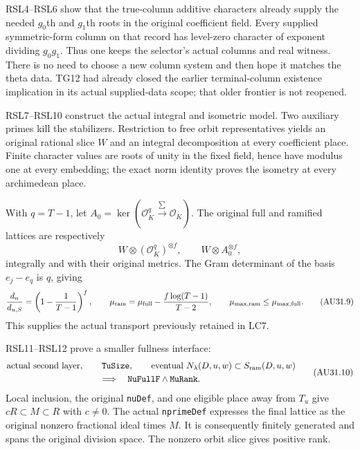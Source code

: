 RSL4--RSL6 show that the true-column additive characters already
supply the needed $g_0$th and $g_1$th roots in the original
coefficient field. Every supplied symmetric-form column on that
record has level-zero character of exponent dividing $g_0g_1$.
Thus one keeps the selector's actual columns and real witness.
There is no need to choose a new column system and then hope
it matches the theta data. TG12 had already closed the earlier
terminal-column existence implication in its actual supplied-data
scope; that older frontier is not reopened.

RSL7--RSL10 construct the actual integral and isometric model.
Two auxiliary primes kill the stabilizers. Restriction to free
orbit representatives yields an original rational slice $W$ and
an integral decomposition at every coefficient place. Finite
character values are roots of unity in the fixed field, hence have
modulus one at every embedding; the exact norm identity proves
the isometry at every archimedean place.

With $q=T-1$, let
$A_0=\ker(\mathcal O_K^q\xrightarrow{\sum}\mathcal O_K)$.
The original full and ramified lattices are respectively
\[
 W\otimes(\mathcal O_K^q)^{\otimes f},
 \qquad W\otimes A_0^{\otimes f},
                                                               \tag{AU31.8}
\]
integrally and with their original metrics. The Gram determinant
of the basis $e_j-e_q$ is $q$, giving
\[
 \frac{d_u}{d_{u,S}}
   =\left(1-\frac1{T-1}\right)^f,\qquad
 \mu_{\rm ram}=\mu_{\rm full}
                     -\frac{f\log(T-1)}{T-2},\qquad
 \mu_{\max,\rm ram}\le\mu_{\max,\rm full}.             \tag{AU31.9}
\]
This supplies the actual transport previously retained in LC7.

RSL11--RSL12 prove a smaller fullness interface:
\[
\begin{gathered}
\text{actual second layer},\qquad\texttt{TuSize},\qquad
\text{eventual }N_\lambda(D,u,w)\subset S_{\rm ram}(D,u,w)\\
\Longrightarrow\quad\texttt{NuFullF}\wedge\texttt{MuRank}.
\end{gathered}                                                   \tag{AU31.10}
\]
Local inclusion, the original \texttt{nuDef}, and one eligible
place away from $T_u$ give
$cR\subset M\subset R$ with $c\ne0$. The actual
\texttt{nprimeDef} expresses the final lattice as the original
nonzero fractional ideal times $M$. It is consequently finitely
generated and spans the original division space. The nonzero
orbit slice gives positive rank.


